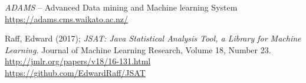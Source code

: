 %

\begin{thebibliography}{999}

		\textit{ADAMS} -- Advanced Data mining and Machine learning System \\
		\url{https://adams.cms.waikato.ac.nz/}{}
		
		Raff, Edward (2017); \textit{JSAT: Java Statistical Analysis Tool, a
		Library for Machine Learning.} Journal of Machine Learning Research,
		Volume 18, Number 23. \\
		\url{http://jmlr.org/papers/v18/16-131.html}{} \\
		\url{https://github.com/EdwardRaff/JSAT}{}

\end{thebibliography}
